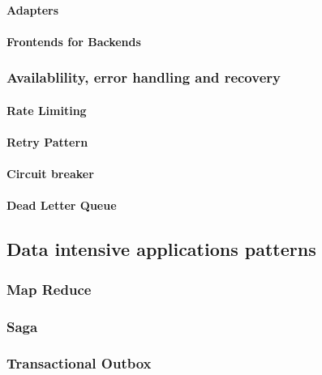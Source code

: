 \documentclass[a4paper, 11pt]{book}
\begin{document}
    \paragraph{Adapters}

    \paragraph{Frontends for Backends}

    \subsubsection{Availablility, error handling and recovery}

    \paragraph{Rate Limiting}

    \paragraph{Retry Pattern}

    \paragraph{Circuit breaker}

    \paragraph{Dead Letter Queue}

    \subsection{Data intensive applications patterns}

    \subsubsection{Map Reduce}

    \subsubsection{Saga}

    \subsubsection{Transactional Outbox}
\end{document}
